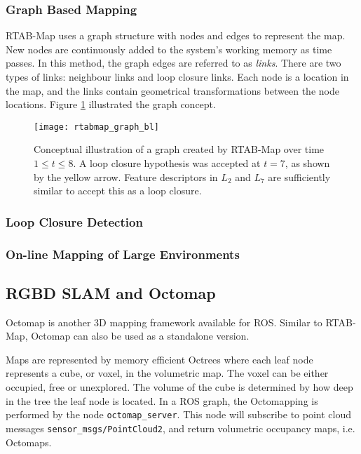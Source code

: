 \subsubsection{Graph Based Mapping}

\ac{RTAB-Map} uses a graph structure with nodes and edges to represent the map. New nodes are continuously added to the system's working memory as time passes. In this method, the graph edges are referred to as \textit{links}. There are two types of links: neighbour links and loop closure links. Each node is a location in the map, and the links contain geometrical transformations between the node locations. Figure \ref{fig:rtabmap_graph} illustrated the graph concept.

\begin{figure}[h]
    \centering
    \texttt{[image: rtabmap\_graph\_bl]}
    \caption{Conceptual illustration of a graph created by \ac{RTAB-Map} over time $1 \leq t \leq 8 $. A loop closure hypothesis was accepted at $t=7$, as shown by the yellow arrow. Feature descriptors in $L_2$ and $L_7$ are sufficiently similar to accept this as a loop closure.}
    \label{fig:rtabmap_graph}
\end{figure}

\subsubsection{Loop Closure Detection}

\subsubsection{On-line Mapping of Large Environments}



\subsection{RGBD SLAM and Octomap}

Octomap\cite{hornung13auro} is another 3D mapping framework available for \ac{ROS}. Similar to \ac{RTAB-Map}, Octomap can also be used as a standalone version. 

Maps are represented by memory efficient Octrees where each leaf node represents a cube, or voxel, in the volumetric map. The voxel can be either occupied, free or unexplored. The volume of the cube is determined by how deep in the tree the leaf node is located. In a \ac{ROS} graph, the Octomapping is performed by the node \texttt{octomap\_server}. This node  will subscribe to point cloud messages \texttt{sensor\_msgs/PointCloud2}, and return volumetric occupancy maps, i.e. Octomaps.


